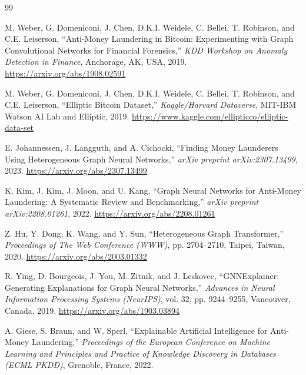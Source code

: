 \begin{thebibliography}{99}

M. Weber, G. Domeniconi, J. Chen, D.K.I. Weidele, C. Bellei, T. Robinson, and C.E. Leiserson,
``Anti-Money Laundering in Bitcoin: Experimenting with Graph Convolutional Networks for Financial Forensics,''
\emph{KDD Workshop on Anomaly Detection in Finance},
Anchorage, AK, USA, 2019.
\url{https://arxiv.org/abs/1908.02591}

M. Weber, G. Domeniconi, J. Chen, D.K.I. Weidele, C. Bellei, T. Robinson, and C.E. Leiserson,
``Elliptic Bitcoin Dataset,''
\emph{Kaggle/Harvard Dataverse}, MIT-IBM Watson AI Lab and Elliptic, 2019.
\url{https://www.kaggle.com/ellipticco/elliptic-data-set}

E. Johannessen, J. Langguth, and A. Cichocki,
``Finding Money Launderers Using Heterogeneous Graph Neural Networks,''
\emph{arXiv preprint arXiv:2307.13499}, 2023.
\url{https://arxiv.org/abs/2307.13499}

K. Kim, J. Kim, J. Moon, and U. Kang,
``Graph Neural Networks for Anti-Money Laundering: A Systematic Review and Benchmarking,''
\emph{arXiv preprint arXiv:2208.01261}, 2022.
\url{https://arxiv.org/abs/2208.01261}

Z. Hu, Y. Dong, K. Wang, and Y. Sun,
``Heterogeneous Graph Transformer,''
\emph{Proceedings of The Web Conference (WWW)},
pp. 2704--2710, Taipei, Taiwan, 2020.
\url{https://arxiv.org/abs/2003.01332}


R. Ying, D. Bourgeois, J. You, M. Zitnik, and J. Leskovec,
``GNNExplainer: Generating Explanations for Graph Neural Networks,''
\emph{Advances in Neural Information Processing Systems (NeurIPS)},
vol. 32, pp. 9244--9255, Vancouver, Canada, 2019.
\url{https://arxiv.org/abs/1903.03894}

A. Giese, S. Braun, and W. Sperl,
``Explainable Artificial Intelligence for Anti-Money Laundering,''
\emph{Proceedings of the European Conference on Machine Learning and Principles and Practice of Knowledge Discovery in Databases (ECML PKDD)},
Grenoble, France, 2022.


\end{thebibliography}
